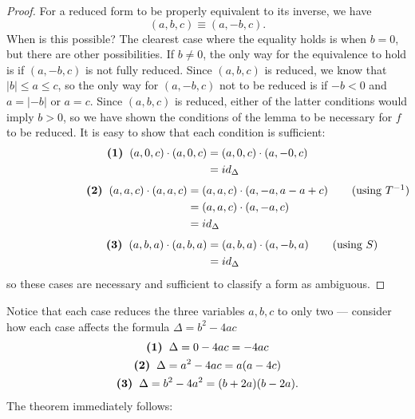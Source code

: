 \documentclass[honours,12pt]{unswthesis}
\newcommand{\rnote}[1]{\rlap{\hspace{0.75cm}$#1$}}
\numberwithin{equation}{section}
\begin{document}
\begin{proof}
    For a reduced form to be properly equivalent to its inverse, we have
    $$(a, b, c) \equiv (a, -b, c).$$
    When is this possible?
    The clearest case where the equality holds is when $b = 0$, but there are other possibilities.
    If $b \neq 0$, the only way for the equivalence to hold is if $(a, -b, c)$ is not fully reduced.
    Since $(a, b, c)$ is reduced, we know that $|b| \leq a \leq c$, 
    so the only way for $(a, -b, c)$ not to be reduced is if $-b < 0$ and $a = |-b|$ or $a = c$.
    Since $(a, b, c)$ is reduced, either of the latter conditions would imply $b > 0$, so we have shown the conditions of the lemma to be necessary for $f$ to be reduced.
    It is easy to show that each condition is sufficient:
    \begin{align*}
        \textbf{(1)} \hspace{2mm}
        (a, 0, c) \cdot (a, 0, c) &= (a, 0, c) \cdot (a, -0, c) \\
        &= id_\Delta
    \end{align*}
    \begin{align*}
        \textbf{(2)} \hspace{2mm}
        (a, a, c) \cdot (a, a, c) &= (a, a, c) \cdot (a, -a, a - a + c) \rnote{\text{(using $T^{-1}$)}} \\
        &= (a, a, c) \cdot (a, -a, c) \\
        &= id_\Delta
    \end{align*}
    \begin{align*}
        \textbf{(3)} \hspace{2mm}
        (a, b, a) \cdot (a, b, a) &= (a, b, a) \cdot (a, -b, a) \rnote{\text{(using $S$)}} \\
        &= id_\Delta
    \end{align*}
    so these cases are necessary and sufficient to classify a form as ambiguous.
\end{proof}

Notice that each case reduces the three variables $a, b, c$ to only two --- 
consider how each case affects the formula $\Delta = b^2 - 4ac$
\begin{gather*}
    \textbf{(1)} \hspace{2mm} \Delta = 0 - 4ac = -4ac \\
    \textbf{(2)} \hspace{2mm} \Delta = a^2 - 4ac = a(a-4c) \\
    \textbf{(3)} \hspace{2mm} \Delta = b^2 - 4a^2 = (b + 2a)(b - 2a).
\end{gather*}
The theorem immediately follows:
\end{document}
